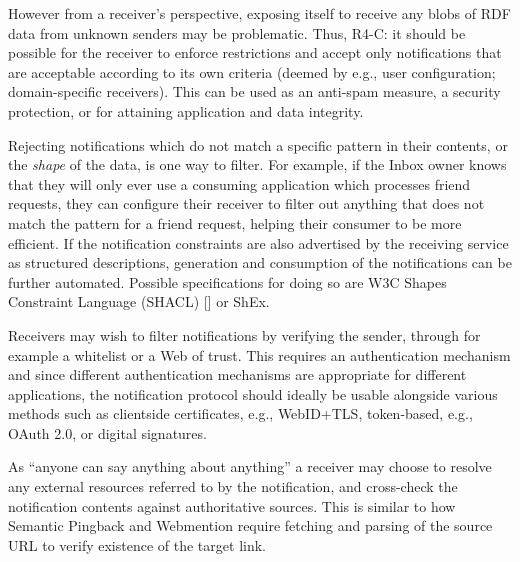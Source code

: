 \documentclass[a4paper]{llncs}
\begin{document}
                                    
                                    
\par However from a receiver’s perspective, exposing itself to receive any blobs of RDF data from unknown senders may be problematic. Thus, R4-C: it should be possible for the receiver to enforce restrictions and accept only notifications that are acceptable according to its own criteria (deemed by e.g., user configuration; domain-specific receivers). This can be used as an anti-spam measure, a security protection, or for attaining application and data integrity.

                                    
\par Rejecting notifications which do not match a specific pattern in their contents, or the {\em shape} of the data, is one way to filter. For example, if the Inbox owner knows that they will only ever use a consuming application which processes friend requests, they can configure their receiver to filter out anything that does not match the pattern for a friend request, helping their consumer to be more efficient. If the notification constraints are also advertised by the receiving service as structured descriptions, generation and consumption of the notifications can be further automated. Possible specifications for doing so are W3C \empty Shapes Constraint Language (SHACL) [] or \empty ShEx.

                                    
\par Receivers may wish to filter notifications by verifying the sender, through for example a whitelist or a Web of trust. This requires an authentication mechanism and since different authentication mechanisms are appropriate for different applications, the notification protocol should ideally be usable alongside various methods such as clientside certificates, e.g., WebID+TLS, token-based, e.g., OAuth 2.0, or digital signatures.

                                    
\par As ``anyone can say anything about anything'' a receiver may choose to resolve any external resources referred to by the notification, and cross-check the notification contents against authoritative sources. This is similar to how Semantic Pingback and Webmention require fetching and parsing of the source URL to verify existence of the target link.
                                    
                                
                            
\end{document}
